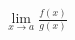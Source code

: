 \documentclass[preview]{standalone}
\begin{document}
\begin{align*}
\lim_{x \to a} \frac{f(x)}{g(x)}
\end{align*}
\end{document}
